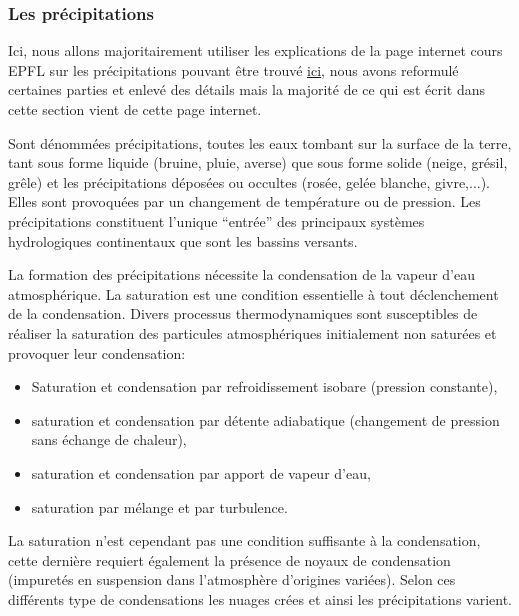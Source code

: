 \documentclass[a4paper,11pt]{article}
\numberwithin{equation}{section}
\begin{document}
\subsubsection{Les précipitations}
\label{ch:precipitations}

Ici, nous allons majoritairement utiliser les explications de la page internet cours EPFL sur les précipitations pouvant être trouvé \href{https://echo2.epfl.ch/e-drologie/chapitres/chapitre3/chapitre3.html}{\underline{ici}}, nous avons reformulé certaines parties et enlevé des détails mais la majorité de ce qui est écrit dans cette section vient de cette page internet.
 
\vspace{0.7cm}
 
Sont dénommées précipitations, toutes les eaux tombant sur la surface de la terre, tant sous forme liquide (bruine, pluie, averse) que sous forme solide (neige, grésil, grêle) et les précipitations déposées ou occultes (rosée, gelée blanche, givre,...). Elles sont provoquées par un changement de température ou de pression. Les précipitations constituent l'unique ``entrée'' des principaux systèmes hydrologiques continentaux que sont les bassins versants. 

La formation des précipitations nécessite la condensation de la vapeur d'eau atmosphérique. La saturation est une condition essentielle à tout déclenchement de la condensation. Divers processus thermodynamiques sont susceptibles de réaliser la saturation des particules atmosphériques initialement non saturées et provoquer leur condensation:

\begin{itemize}
	\item Saturation et condensation par refroidissement isobare (pression constante),
	\item saturation et condensation par détente adiabatique (changement de pression sans échange de chaleur),
	\item saturation et condensation par apport de vapeur d'eau,
	\item saturation par mélange et par turbulence.
\end{itemize}
La saturation n'est cependant pas une condition suffisante à la condensation, cette dernière requiert également la présence de noyaux de condensation (impuretés en suspension dans l'atmosphère d'origines variées). Selon ces différents type de condensations les nuages crées et ainsi les précipitations varient.

\vspace{0.7cm}
\end{document}
